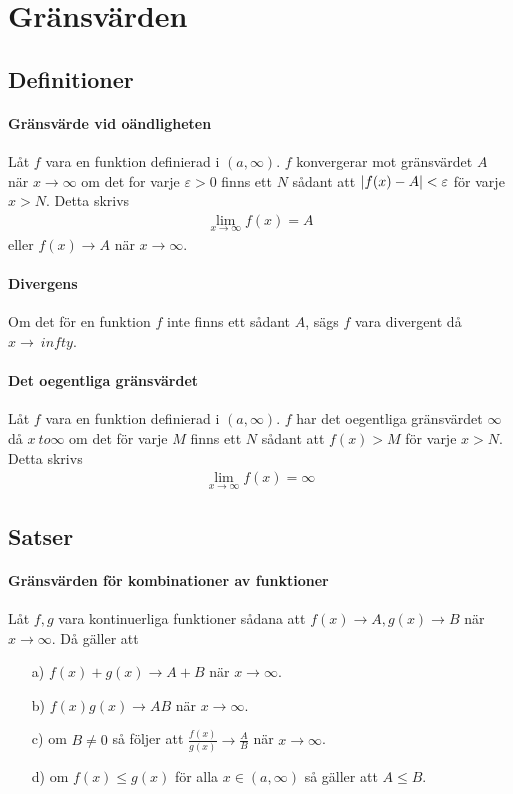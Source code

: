 \section{Gränsvärden}

\subsection{Definitioner}

\paragraph{Gränsvärde vid oändligheten}
Låt $f$ vara en funktion definierad i $(a, \infty)$. $f$ konvergerar mot gränsvärdet $A$ när $x\to\infty$ om det for varje $\varepsilon > 0$ finns ett $N$ sådant att $\abs{f(x) - A} < \varepsilon$ för varje $x > N$. Detta skrivs
\begin{align*}
	\lim_{x \to \infty} f(x) = A
\end{align*}
eller $f(x) \to A$ när $x \to \infty$.

\paragraph{Divergens}
Om det för en funktion $f$ inte finns ett sådant $A$, sägs $f$ vara divergent då $x \to \ infty$.

\paragraph{Det oegentliga gränsvärdet}
Låt $f$ vara en funktion definierad i $(a, \infty)$. $f$ har det oegentliga gränsvärdet $\infty$ då $x \ to \infty$ om det för varje $M$ finns ett $N$ sådant att $f(x) > M$ för varje $x > N$. Detta skrivs
\begin{align*}
	\lim_{x \to \infty} f(x) = \infty
\end{align*}

\subsection{Satser}

\paragraph{Gränsvärden för kombinationer av funktioner}
Låt $f,g$ vara kontinuerliga funktioner sådana att $f(x)\to A, g(x)\to B$ när $x\to\infty$. Då gäller att
\begin{itemize}
	\item[a)] $f(x) + g(x)\to A + B$ när $x\to\infty$.
	\item[b)] $f(x)g(x)\to AB$ när $x\to\infty$.
	\item[c)] om $B\neq 0$ så följer att $\frac{f(x)}{g(x)}\to\frac{A}{B}$ när $x\to\infty$.
	\item[d)] om $f(x)\leq g(x)$ för alla $x\in (a,\infty)$ så gäller att $A\leq B$.
\end{itemize}

